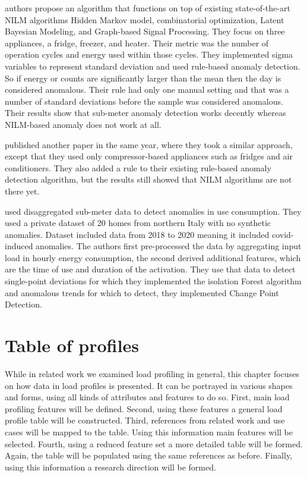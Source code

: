 \cite{NILMAD2019} authors propose an algorithm
that functions on top of existing state-of-the-art NILM algorithms Hidden Markov model,
combinatorial optimization, Latent Bayesian Modeling, and Graph-based Signal Processing.
They focus on three appliances, a fridge, freezer, and heater. Their metric was the number of operation cycles and energy used within those cycles. 
They implemented sigma variables to represent standard deviation and used rule-based anomaly detection.
So if energy or counts are significantly larger than the mean then the day is considered anomalous.
Their rule had only one manual setting and that was a number of standard deviations before the sample was considered anomalous.
Their results show that sub-meter anomaly detection works decently whereas NILM-based anomaly does not work at all. 

\cite{NILMAD22019} published another paper in the same year, where they took a similar approach, except that they used 
only compressor-based appliances such as fridges and air conditioners. They also added a rule to their existing rule-based anomaly 
detection algorithm, but the results still showed that NILM algorithms are not there yet. 

\cite{Castangia2021} used disaggregated sub-meter data to detect anomalies in use consumption.
They used a private dataset of 20 homes from northern Italy with no synthetic anomalies. 
Dataset included data from 2018 to 2020 meaning it included covid-induced anomalies. 
The authors first pre-processed the data by aggregating input load in hourly energy consumption, 
the second derived additional features, which are the time of use and duration of the activation.
They use that data to detect single-point deviations for which they implemented the isolation Forest algorithm and
anomalous trends for which to detect, they implemented Change Point Detection. 


\section{Table of profiles}

While in related work we examined load profiling in general,
this chapter focuses on how data in load profiles is presented.  
It can be portrayed in various shapes and forms,
using all kinds of attributes and features to do so. 
First, main load profiling features will be defined.
Second, using these features a general load profile table will be constructed.
Third, references from related work and use cases will be mapped to the table.
Using this information main features will be selected.
Fourth, using a reduced feature set a more detailed table will be formed.
Again, the table will be populated using the same references as before.
Finally, using this information a research direction will be formed.


